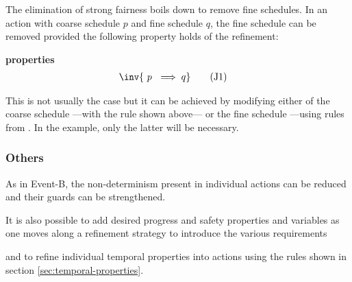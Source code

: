 The elimination of strong fairness boils down to remove fine schedules. In an action with coarse schedule $p$ and fine schedule $q$, the fine schedule can be removed provided the following property holds of the refinement:


\begin{minipage}{0.48\textwidth}
\bf{properties}
\begin{align}
& \inv{~ p  ~\implies q } \tag{J1}  \label{ref:isf:J1}
\end{align}
\end{minipage}


This is not usually the case but it can be achieved by modifying either of the coarse schedule ---with the rule shown above--- or the fine schedule ---using rules from \cite{thesis/hudon2011}.  In the example, only the latter will be necessary.

\subsubsection{Others}

As in Event-B, the non-determinism present in individual actions can be reduced and their guards can be strengthened.

It is also possible to add desired progress and safety properties and variables as one moves along a refinement strategy to introduce the various requirements 

and to refine individual temporal properties into actions using the rules shown in section \ref{sec:temporal-properties}.


